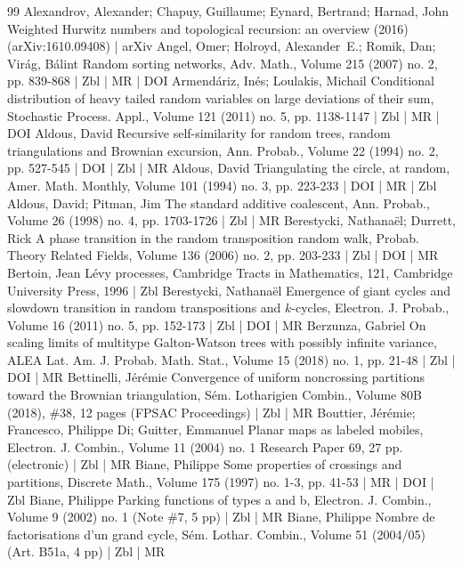 \begin{thebibliography}{99}
Alexandrov, Alexander; Chapuy, Guillaume; Eynard, Bertrand; Harnad, John Weighted Hurwitz numbers and topological recursion: an overview (2016) (arXiv:1610.09408) | arXiv
Angel, Omer; Holroyd, Alexander E.; Romik, Dan; Virág, Bálint Random sorting networks, Adv. Math., Volume 215 (2007) no. 2, pp. 839-868 | Zbl | MR | DOI
Armendáriz, Inés; Loulakis, Michail Conditional distribution of heavy tailed random variables on large deviations of their sum, Stochastic Process. Appl., Volume 121 (2011) no. 5, pp. 1138-1147 | Zbl | MR | DOI
Aldous, David Recursive self-similarity for random trees, random triangulations and Brownian excursion, Ann. Probab., Volume 22 (1994) no. 2, pp. 527-545 | DOI | Zbl | MR
Aldous, David Triangulating the circle, at random, Amer. Math. Monthly, Volume 101 (1994) no. 3, pp. 223-233 | DOI | MR | Zbl
Aldous, David; Pitman, Jim The standard additive coalescent, Ann. Probab., Volume 26 (1998) no. 4, pp. 1703-1726 | Zbl | MR
Berestycki, Nathanaël; Durrett, Rick A phase transition in the random transposition random walk, Probab. Theory Related Fields, Volume 136 (2006) no. 2, pp. 203-233 | Zbl | DOI | MR
Bertoin, Jean Lévy processes, Cambridge Tracts in Mathematics, 121, Cambridge University Press, 1996 | Zbl
Berestycki, Nathanaël Emergence of giant cycles and slowdown transition in random transpositions and $k$-cycles, Electron. J. Probab., Volume 16 (2011) no. 5, pp. 152-173 | Zbl | DOI | MR
Berzunza, Gabriel On scaling limits of multitype Galton-Watson trees with possibly infinite variance, ALEA Lat. Am. J. Probab. Math. Stat., Volume 15 (2018) no. 1, pp. 21-48 | Zbl | DOI | MR
Bettinelli, Jérémie Convergence of uniform noncrossing partitions toward the Brownian triangulation, Sém. Lotharigien Combin., Volume 80B (2018), \#38, 12 pages (FPSAC Proceedings) | Zbl | MR
Bouttier, Jérémie; Francesco, Philippe Di; Guitter, Emmanuel Planar maps as labeled mobiles, Electron. J. Combin., Volume 11 (2004) no. 1 Research Paper 69, 27 pp. (electronic) | Zbl | MR
Biane, Philippe Some properties of crossings and partitions, Discrete Math., Volume 175 (1997) no. 1-3, pp. 41-53 | MR | DOI | Zbl
Biane, Philippe Parking functions of types a and b, Electron. J. Combin., Volume 9 (2002) no. 1 (Note \#7, 5 pp) | Zbl | MR
Biane, Philippe Nombre de factorisations d’un grand cycle, Sém. Lothar. Combin., Volume 51 (2004/05) (Art. B51a, 4 pp) | Zbl | MR

\end{thebibliography}
